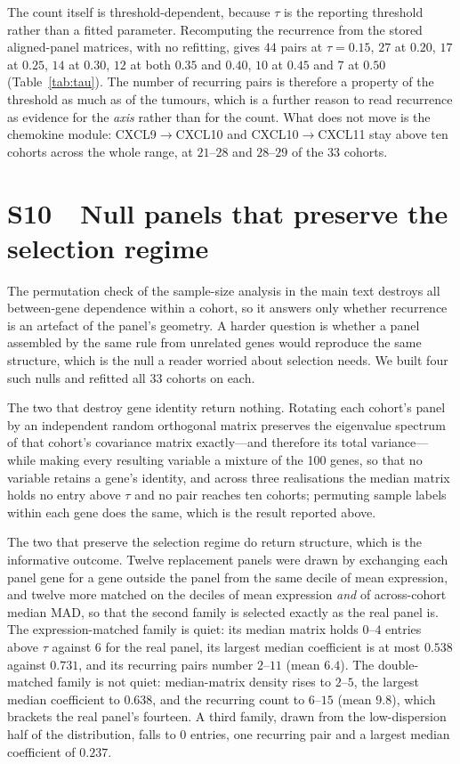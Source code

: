 \documentclass[11pt]{article}
\begin{document}
The count itself is threshold-dependent, because $\tau$ is the reporting threshold rather than a fitted parameter. Recomputing the recurrence from the stored aligned-panel matrices, with no refitting, gives $44$ pairs at $\tau = 0.15$, $27$ at $0.20$, $17$ at $0.25$, $14$ at $0.30$, $12$ at both $0.35$ and $0.40$, $10$ at $0.45$ and $7$ at $0.50$ (Table~\ref{tab:tau}). The number of recurring pairs is therefore a property of the threshold as much as of the tumours, which is a further reason to read recurrence as evidence for the \emph{axis} rather than for the count. What does not move is the chemokine module: CXCL9$\rightarrow$CXCL10 and CXCL10$\rightarrow$CXCL11 stay above ten cohorts across the whole range, at $21$--$28$ and $28$--$29$ of the 33 cohorts.

\section*{S10\ \ Null panels that preserve the selection regime}

The permutation check of the sample-size analysis in the main text destroys all between-gene dependence within a cohort, so it answers only whether recurrence is an artefact of the panel's geometry. A harder question is whether a panel assembled by the same rule from unrelated genes would reproduce the same structure, which is the null a reader worried about selection needs. We built four such nulls and refitted all 33 cohorts on each.

The two that destroy gene identity return nothing. Rotating each cohort's panel by an independent random orthogonal matrix preserves the eigenvalue spectrum of that cohort's covariance matrix exactly---and therefore its total variance---while making every resulting variable a mixture of the 100 genes, so that no variable retains a gene's identity, and across three realisations the median matrix holds no entry above $\tau$ and no pair reaches ten cohorts; permuting sample labels within each gene does the same, which is the result reported above.

The two that preserve the selection regime do return structure, which is the informative outcome. Twelve replacement panels were drawn by exchanging each panel gene for a gene outside the panel from the same decile of mean expression, and twelve more matched on the deciles of mean expression \emph{and} of across-cohort median MAD, so that the second family is selected exactly as the real panel is. The expression-matched family is quiet: its median matrix holds $0$--$4$ entries above $\tau$ against $6$ for the real panel, its largest median coefficient is at most $0.538$ against $0.731$, and its recurring pairs number $2$--$11$ (mean $6.4$). The double-matched family is not quiet: median-matrix density rises to $2$--$5$, the largest median coefficient to $0.638$, and the recurring count to $6$--$15$ (mean $9.8$), which brackets the real panel's fourteen. A third family, drawn from the low-dispersion half of the distribution, falls to $0$ entries, one recurring pair and a largest median coefficient of $0.237$.
\end{document}
